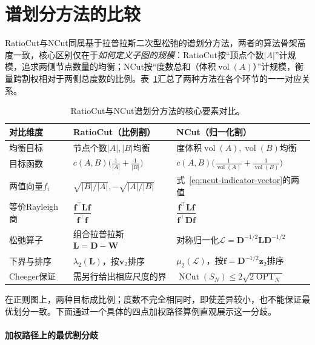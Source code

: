 \section{谱划分方法的比较}
\label{sec:graph-spectral-partition-comparison}

RatioCut与NCut同属基于拉普拉斯二次型松弛的谱划分方法，两者的算法骨架高度一致，核心区别仅在于\emph{如何定义子图的规模}：RatioCut按“顶点个数$|A|$”计规模，追求两侧节点数量的均衡；NCut按“度数总和（体积$\operatorname{vol}(A)$）”计规模，衡量跨割权相对于两侧总度数的比例。表~\ref{tab:ratiocut-vs-ncut}汇总了两种方法在各个环节的一一对应关系。

\begin{table}[!htb]
\centering
\caption{RatioCut与NCut谱划分方法的核心要素对比。}
\label{tab:ratiocut-vs-ncut}
\footnotesize
\begin{tabular}{lll}
\toprule
对比维度 & RatioCut（比例割） & NCut（归一化割）\\
\midrule
均衡目标 & 节点个数$|A|,|B|$均衡 & 度体积$\operatorname{vol}(A),\operatorname{vol}(B)$均衡\\
目标函数 & $c(A,B)\bigl(\frac{1}{|A|}+\frac{1}{|B|}\bigr)$ & $c(A,B)\bigl(\frac{1}{\operatorname{vol}(A)}+\frac{1}{\operatorname{vol}(B)}\bigr)$\\
两值向量$f_i$ & $\sqrt{|B|/|A|},-\sqrt{|A|/|B|}$ & 式~\eqref{eq:ncut-indicator-vector}的两值\\
等价Rayleigh商 & $\dfrac{\bm f^\top\bm L\bm f}{\bm f^\top\bm f}$ & $\dfrac{\bm f^\top\bm L\bm f}{\bm f^\top\bm D\bm f}$\\
松弛算子 & 组合拉普拉斯$\bm L=\bm D-\bm W$ & 对称归一化$\mathcal L=\bm D^{-1/2}\bm L\bm D^{-1/2}$\\
下界与排序 & $\lambda_2(\bm L)$，按$\bm v_2$排序 & $\mu_2(\mathcal L)$，按$\bm f=\bm D^{-1/2}\bm z_2$排序\\
Cheeger保证 & 需另行给出相应尺度的界 & $\operatorname{NCut}(S_N)\leq 2\sqrt{2\operatorname{OPT}_N}$\\
\bottomrule
\end{tabular}
\end{table}

在正则图上，两种目标成比例；度数不完全相同时，即使差异较小，也不能保证最优划分一致。下面通过一个具体的四点加权路径算例直观展示这一分歧。

\paragraph{加权路径上的最优割分歧}

